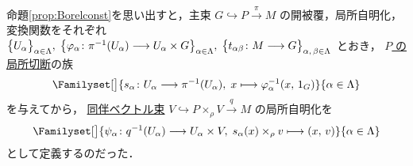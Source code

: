\documentclass[TQFT_main]{subfiles}
\begin{document}
命題\ref{prop:Borelconst}を思い出すと，主束 $G \hookrightarrow P \xrightarrow{\pi} M$ の開被覆，局所自明化，変換関数をそれぞれ $\bigl\{ U_\alpha \bigr\}_{\alpha \in \Lambda},\; \bigl\{ \varphi_\alpha \colon \pi^{-1}(U_\alpha) \longrightarrow U_\alpha \times G \bigr\}_{\alpha \in \Lambda},\; \bigl\{  t_{\alpha\beta} \colon M \longrightarrow G  \bigr\}_{\alpha,\, \beta \in \Lambda}$ とおき，
\underline{$P$ の}\hyperref[def.section]{局所切断}の族
\begin{align}
    \label{eq:assoc-sec}
    \Familyset[\big]{s_\alpha \colon U_\alpha \lto \pi^{-1}(U_\alpha),\; x \lmto \varphi_\alpha^{-1}(x,\, 1_G)}{\alpha \in \Lambda}
\end{align}
を与えてから，
\hyperref[def:associated-vect]{同伴ベクトル束} $V \hookrightarrow P \times_\rho V \xrightarrow{q} M$ の局所自明化を
\begin{align}
    \label{eq:assoc-loctriv}
    \Familyset[\big]{\psi_\alpha \colon q^{-1}(U_\alpha) \lto U_\alpha \times V,\; s_\alpha(x) \times_\rho v \lmto (x,\, v)}{\alpha \in \Lambda}
\end{align}
として定義するのだった．
\end{document}
